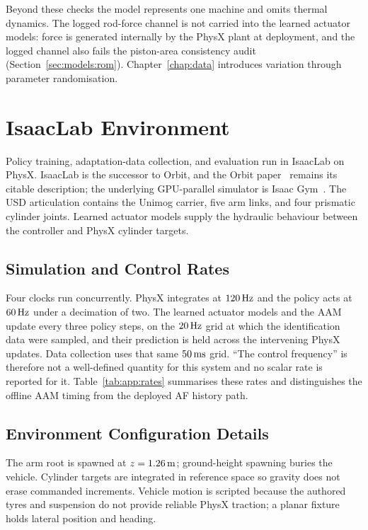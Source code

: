 Beyond these checks the model represents one machine and omits thermal
dynamics. The logged rod-force channel is not carried into the learned actuator
models: force is generated internally by the PhysX plant at deployment, and the
logged channel also fails the piston-area consistency audit
(Section~\ref{sec:models:rom}). Chapter~\ref{chap:data} introduces variation
through parameter randomisation.

\section{IsaacLab Environment}
\label{sec:sys:isaaclab}

Policy training, adaptation-data collection, and evaluation run in IsaacLab on
PhysX. IsaacLab is the successor to Orbit, and the Orbit
paper~\cite{mittal2023orbit} remains its citable description; the underlying
GPU-parallel simulator is Isaac Gym~\cite{makoviychuk2021isaac}. The USD articulation contains the
Unimog carrier, five arm links, and four prismatic cylinder joints. Learned
actuator models supply the hydraulic behaviour between the controller and PhysX
cylinder targets.

\subsection{Simulation and Control Rates}
\label{sec:sys:timing}

Four clocks run concurrently. PhysX integrates at $\unit[120]{Hz}$ and the
policy acts at $\unit[60]{Hz}$ under a decimation of two. The learned actuator
models and the AAM update every three policy steps, on the $\unit[20]{Hz}$ grid
at which the identification data were sampled, and their prediction is held
across the intervening PhysX updates. Data collection uses that same
$\unit[50]{ms}$ grid. ``The control frequency'' is therefore not a well-defined
quantity for this system and no scalar rate is reported for it.
Table~\ref{tab:app:rates} summarises these rates and distinguishes the offline
AAM timing from the deployed AF history path.

\subsection{Environment Configuration Details}

The arm root is spawned at $z=\unit[1.26]{m}$; ground-height spawning buries
the vehicle. Cylinder targets are integrated in reference space so gravity does
not erase commanded increments. Vehicle motion is scripted because the authored
tyres and suspension do not provide reliable PhysX traction; a planar fixture
holds lateral position and heading.

